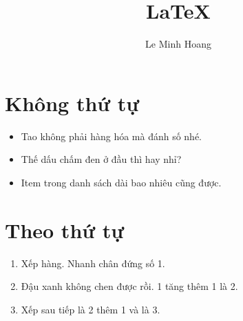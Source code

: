 \documentclass[a4paper]{article}
\title{LaTeX}
\author{Le Minh Hoang}
\date{}
\begin{document}
\section{Không thứ tự}
\begin{itemize}
  \item Tao không phải hàng hóa mà đánh số nhé.
  \item Thế dấu chấm đen ở đầu thì hay nhỉ?
  \item Item trong danh sách dài bao nhiêu cũng được.
\end{itemize}

\section{Theo thứ tự}
\begin{enumerate}
  \item Xếp hàng. Nhanh chân đứng số 1.
  \item Đậu xanh không chen được rồi. 1 tăng thêm 1 là 2.
  \item Xếp sau tiếp là 2 thêm 1 và là 3.
\end{enumerate}
\end{document}
